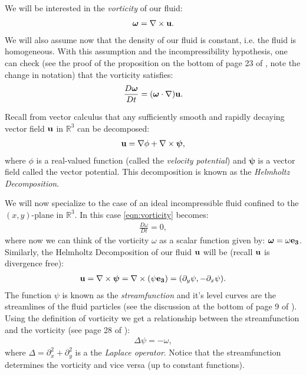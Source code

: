 \documentclass[10pt,oneside]{amsart}
\theoremstyle{definition}
\theoremstyle{remark}
\numberwithin{equation}{section}
\begin{document}
We will be interested in the {\it vorticity} of our fluid:
\begin{align*}
\bm{\omega} = \nabla \times {\bf u}. 
\end{align*}
We will also assume now that the density of our fluid is constant, i.e. the fluid is homogeneous. With this assumption and the incompressibility hypothesis, one can check (see the proof of the proposition on the bottom of page 23 of \cite{book:chorin}, note the change in notation) that the vorticity satisfies:
\begin{align}
\label{eqn:vorticity}
\frac{D \bm{\omega}}{Dt}  = (\bm{\omega} \cdot \nabla) \bf{u}. 
\end{align} 

Recall from vector calculus that any sufficiently smooth and rapidly decaying vector field ${\bf u}$ in $\mathbb{R}^3$ can be decomposed:
\begin{align*}
{\bf u} = \nabla \phi + \nabla \times \bm{\psi},
\end{align*}  
where $\phi$ is a real-valued function (called the {\it velocity potential}) and $\bm{\psi}$ is a vector field called the vector potential. This decomposition is known as the {\it Helmholtz Decomposition}. 

We will now specialize to the case of an ideal incompressible fluid confined to the $(x,y)$-plane in $\mathbb{R}^3$. In this case \eqref{eqn:vorticity} becomes:
\begin{align*}
\frac{D \omega}{Dt} = 0, 
\end{align*}
where now we can think of the vorticity $\omega$ as a scalar function given by: $\bm{\omega} = \omega \bf{e_3}$. Similarly, the Helmholtz Decomposition of our fluid ${\bf u}$ will be (recall ${\bf u}$ is divergence free):
\begin{align*}
{\bf u} = \nabla \times \bm{\psi} = \nabla \times (\psi {\bf e_3}) =  (\partial_y \psi, -\partial_x \psi).
\end{align*}
The function $\psi$ is known as the {\it streamfunction} and it's level curves are the streamlines of the fluid particles (see the discussion at the bottom of page 9 of \cite{book:newton}). Using the definition of vorticity we get a relationship between the streamfunction and the vorticity (see page 28 of \cite{book:chorin}):
\begin{align}
\label{eqn:poisson}
\Delta \psi =- \omega, 
\end{align}
where $\Delta = \partial_x^2+ \partial_y^2$ is a the {\it Laplace operator}. 
Notice that the streamfunction determines the vorticity and vice versa (up to constant functions). 
\end{document}
